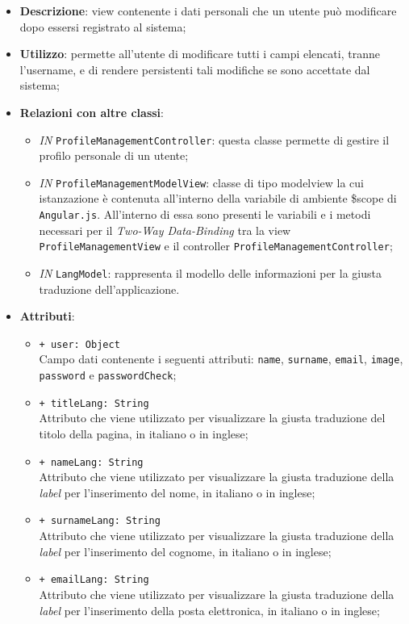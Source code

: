 \begin{itemize}
	\item \textbf{Descrizione}: view contenente i dati personali che un utente può modificare dopo essersi registrato al sistema;
	\item \textbf{Utilizzo}: permette all'utente di modificare tutti i campi elencati, tranne l'username, e di rendere persistenti tali modifiche se sono accettate dal sistema;
	\item \textbf{Relazioni con altre classi}:
	\begin{itemize}
		\item \textit{IN} \texttt{ProfileManagementController}: questa classe permette di gestire il profilo personale di un utente;
		\item \textit{IN} \texttt{ProfileManagementModelView}: classe di tipo modelview la cui istanzazione è contenuta all'interno della variabile di ambiente \$scope di \texttt{Angular.js}. All'interno di essa sono presenti le variabili e i metodi necessari per il \textit{Two-Way Data-Binding} tra la view \texttt{ProfileManagementView} e il controller \texttt{ProfileManagementController};
		\item \textit{IN} \texttt{LangModel}: rappresenta il modello delle informazioni per la giusta traduzione dell'applicazione.
	\end{itemize}
	\item \textbf{Attributi}:
	\begin{itemize}
		\item \texttt{+ user: Object} \\ Campo dati contenente i seguenti attributi: \texttt{name}, \texttt{surname}, \texttt{email}, \texttt{image}, \texttt{password} e \texttt{passwordCheck};
		\item \texttt{+ titleLang: String} \\ Attributo che viene utilizzato per visualizzare la giusta traduzione del titolo della pagina, in italiano o in inglese;
		\item \texttt{+ nameLang: String} \\ Attributo che viene utilizzato per visualizzare la giusta traduzione della \textit{label} per l'inserimento del nome, in italiano o in inglese;
		\item \texttt{+ surnameLang: String} \\ Attributo che viene utilizzato per visualizzare la giusta traduzione della \textit{label} per l'inserimento del cognome, in italiano o in inglese;
		\item \texttt{+ emailLang: String} \\ Attributo che viene utilizzato per visualizzare la giusta traduzione della \textit{label} per l'inserimento della posta elettronica, in italiano o in inglese;

\end{itemize}
\end{itemize}
